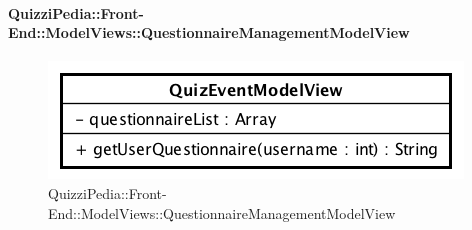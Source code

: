 \paragraph{QuizziPedia::Front-End::ModelViews::QuestionnaireManagementModelView}
	
	\label{QuizziPedia::Front-End::ModelViews::QuestionnaireManagementModelView}
	
	\begin{figure}[ht]
		\centering
		\includegraphics[scale=0.5,keepaspectratio]{UML/Classi/Front-End/QuizziPedia_Front-end_ModelView_QuestionnaireManagementModelView.png}
		\caption{QuizziPedia::Front-End::ModelViews::QuestionnaireManagementModelView}
	\end{figure} \FloatBarrier
	

